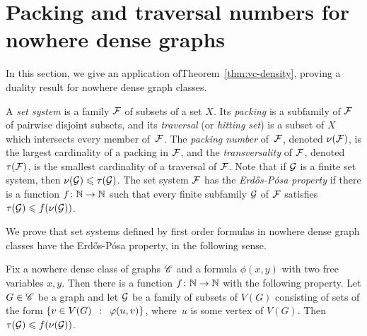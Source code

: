 \section{Packing and traversal numbers for nowhere dense graphs}\label{sec:ep}
In this section, we give an application 
ofTheorem~\ref{thm:vc-density}, proving a 
duality result for nowhere dense graph classes.

A \emph{set system} is a family  $\cal F$ of subsets of a set $X$.
Its  \emph{packing} is a subfamily of $\cal F$ of pairwise disjoint subsets, and its \emph{traversal} (or \emph{hitting set}) is a subset of $X$ which intersects every member of~$\cal F$.
The \emph{packing number} of~$\cal F$, denoted $\nu(\cal F)$, is the largest cardinality of a packing in $\cal F$,
and the \emph{transversality} of $\cal F$, denoted
$\tau(\cal F)$, is the smallest cardinality of a traversal of $\cal F$.
Note that if $\cal G$ is a finite set system, then
$\nu({\cal G})\le \tau(\cal G)$. 
The set system $\cal F$ has the \emph{Erd{\H o}s-P\'{o}sa property} if there is a function $f\from\N\to\N$ such that every finite subfamily $\cal G$ of $\cal F$
satisfies $\tau({\cal G})\le f(\nu(\cal G))$. 

We prove that set systems defined by first order formulas in nowhere dense graph classes have the Erd{\H o}s-P\'{o}sa property, in the following sense.

 \setcounter{aux}{\value{theorem}}
 \setcounter{theorem}{\value{ep}}
  \setcounter{auxsec}{\value{section}}
 \setcounter{section}{1}
\begin{theorem}
	Fix a nowhere dense class of graphs $\CCC$ and a 
	formula $\phi(x,y)$ with two free variables $x,y$.
	Then there is a function $f\from \N\to\N$ with the following property.
	Let $G\in \CCC$ be a graph and let $\cal G$
	be a family of subsets of $V(G)$ consisting of sets of the form $\setof{v\in V(G)}{\phi(u, v)}$, where~$u$ is some vertex of $V(G)$.
Then~$\tau({\cal G})\le f(\nu(\cal G))$.
\end{theorem}
 \setcounter{theorem}{\value{aux}}
 \setcounter{section}{\value{auxsec}}


